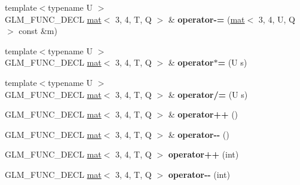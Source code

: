 \begin{DoxyCompactItemize}
{\footnotesize template$<$typename U $>$ }\\G\+L\+M\+\_\+\+F\+U\+N\+C\+\_\+\+D\+E\+CL \hyperlink{structglm_1_1mat}{mat}$<$ 3, 4, T, Q $>$ \& {\bfseries operator-\/=} (\hyperlink{structglm_1_1mat}{mat}$<$ 3, 4, U, Q $>$ const \&m)
\item 
\mbox{\label{structglm_1_1mat_3_013_00_014_00_01T_00_01Q_01_4_a7e71aded236353963c211f3c5401201f}} 
{\footnotesize template$<$typename U $>$ }\\G\+L\+M\+\_\+\+F\+U\+N\+C\+\_\+\+D\+E\+CL \hyperlink{structglm_1_1mat}{mat}$<$ 3, 4, T, Q $>$ \& {\bfseries operator$\ast$=} (U s)
\item 
\mbox{\label{structglm_1_1mat_3_013_00_014_00_01T_00_01Q_01_4_ad030328f7205db4ada21b930d484bdea}} 
{\footnotesize template$<$typename U $>$ }\\G\+L\+M\+\_\+\+F\+U\+N\+C\+\_\+\+D\+E\+CL \hyperlink{structglm_1_1mat}{mat}$<$ 3, 4, T, Q $>$ \& {\bfseries operator/=} (U s)
\item 
\mbox{\label{structglm_1_1mat_3_013_00_014_00_01T_00_01Q_01_4_a03979bbfa60bbc49190ce6fd347ca6ee}} 
G\+L\+M\+\_\+\+F\+U\+N\+C\+\_\+\+D\+E\+CL \hyperlink{structglm_1_1mat}{mat}$<$ 3, 4, T, Q $>$ \& {\bfseries operator++} ()
\item 
\mbox{\label{structglm_1_1mat_3_013_00_014_00_01T_00_01Q_01_4_a127c5f4434bbd959b577ae5dfd808c10}} 
G\+L\+M\+\_\+\+F\+U\+N\+C\+\_\+\+D\+E\+CL \hyperlink{structglm_1_1mat}{mat}$<$ 3, 4, T, Q $>$ \& {\bfseries operator-\/-\/} ()
\item 
\mbox{\label{structglm_1_1mat_3_013_00_014_00_01T_00_01Q_01_4_ad8fc281f2fb4cd5fd107f4c4a1a04be8}} 
G\+L\+M\+\_\+\+F\+U\+N\+C\+\_\+\+D\+E\+CL \hyperlink{structglm_1_1mat}{mat}$<$ 3, 4, T, Q $>$ {\bfseries operator++} (int)
\item 
\mbox{\label{structglm_1_1mat_3_013_00_014_00_01T_00_01Q_01_4_a61b4e82bca6ca608b52da28a1ea5333a}} 
G\+L\+M\+\_\+\+F\+U\+N\+C\+\_\+\+D\+E\+CL \hyperlink{structglm_1_1mat}{mat}$<$ 3, 4, T, Q $>$ {\bfseries operator-\/-\/} (int)

\end{DoxyCompactItemize}
